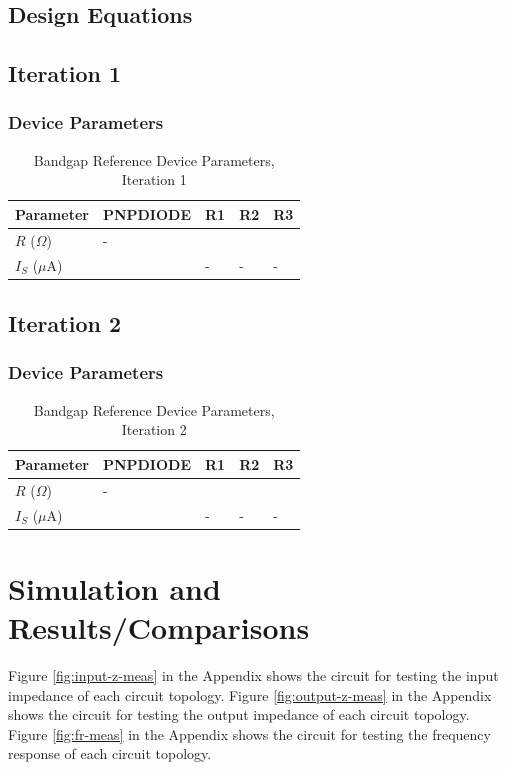 \documentclass[conference]{IEEEtran}
\begin{document}
\subsection{Design Equations}

\subsection{Iteration 1}
	\subsubsection{Device Parameters}
\begin{table}[!htbp]
  \caption[]{Bandgap Reference Device Parameters, Iteration 1}
  \label{tab:bg-dp-1}
  \centering
  \begin{tabular}{|l|l|l|l|l|}
    \hline
    Parameter			& PNPDIODE	&R1 &R2	&R3 \\ \hline
    $R$ ($\Omega$)		&-		&	&	&\\ \hline
    $I_S$ ($\mu$A)		&		&-	&-	&-\\
    \hline
  \end{tabular}
\end{table}

\subsection{Iteration 2}
	\subsubsection{Device Parameters}
\begin{table}[!htbp]
  \caption[]{Bandgap Reference Device Parameters, Iteration 2}
  \label{tab:bg-dp-2}
  \centering
  \begin{tabular}{|l|l|l|l|l|}
    \hline
    Parameter			& PNPDIODE	&R1 &R2	&R3 \\ \hline
    $R$ ($\Omega$)		&-		&	&	&\\ \hline
    $I_S$ ($\mu$A)		&		&-	&-	&-\\
    \hline
  \end{tabular}
\end{table}

\section{Simulation and Results/Comparisons}
Figure \ref{fig:input-z-meas} in the Appendix shows the circuit for testing the input impedance of each circuit topology.  Figure \ref{fig:output-z-meas} in the Appendix shows the circuit for testing the output impedance of each circuit topology.  Figure \ref{fig:fr-meas} in the Appendix shows the circuit for testing the frequency response of each circuit topology.\\
\end{document}
